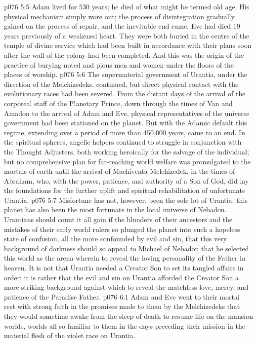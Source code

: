 \vs p076 5:5 \pc Adam lived for 530 years; he died of what might be termed old age. His physical mechanism simply wore out; the process of disintegration gradually gained on the process of repair, and the inevitable end came. Eve had died 19 years previously of a weakened heart. They were both buried in the centre of the temple of divine service which had been built in accordance with their plans soon after the wall of the colony had been completed. And this was the origin of the practice of burying noted and pious men and women under the floors of the places of worship.
\vs p076 5:6 \pc The supermaterial government of Urantia, under the direction of the Melchizedeks, continued, but direct physical contact with the evolutionary races had been severed. From the distant days of the arrival of the corporeal staff of the Planetary Prince, down through the times of Van and Amadon to the arrival of Adam and Eve, physical representatives of the universe government had been stationed on the planet. But with the Adamic default this regime, extending over a period of more than 450,000 years, came to an end. In the spiritual spheres, angelic helpers continued to struggle in conjunction with the Thought Adjusters, both working heroically for the salvage of the individual; but no comprehensive plan for far\hyp{}reaching world welfare was promulgated to the mortals of earth until the arrival of Machiventa Melchizedek, in the times of Abraham, who, with the power, patience, and authority of a Son of God, did lay the foundations for the further uplift and spiritual rehabilitation of unfortunate Urantia.
\vs p076 5:7 Misfortune has not, however, been the sole lot of Urantia; this planet has also been the most fortunate in the local universe of Nebadon. Urantians should count it all gain if the blunders of their ancestors and the mistakes of their early world rulers so plunged the planet into such a hopeless state of confusion, all the more confounded by evil and sin, that this very background of darkness should so appeal to Michael of Nebadon that he selected this world as the arena wherein to reveal the loving personality of the Father in heaven. It is not that Urantia needed a Creator Son to set its tangled affairs in order; it is rather that the evil and sin on Urantia afforded the Creator Son a more striking background against which to reveal the matchless love, mercy, and patience of the Paradise Father.
\vs p076 6:1 Adam and Eve went to their mortal rest with strong faith in the promises made to them by the Melchizedeks that they would sometime awake from the sleep of death to resume life on the mansion worlds, worlds all so familiar to them in the days preceding their mission in the material flesh of the violet race on Urantia.
